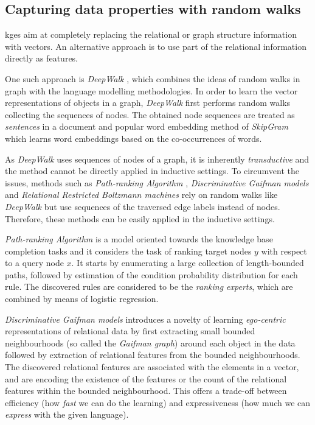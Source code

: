  
 
 





\subsection{Capturing data properties with random walks}


\gls{kge}s aim at completely replacing the relational or graph structure information with vectors.
An alternative approach is to use part of the relational information directly as features.


One such approach is \textit{DeepWalk} \cite{Perozzi:2014:DOL:2623330.2623732}, which combines the ideas of random walks in graph with the language modelling methodologies.
In order to learn the vector representations of objects in a graph, \textit{DeepWalk} first performs random walks collecting the sequences of nodes.
The obtained node sequences are treated as \textit{sentences} in a document and popular word embedding method of  \textit{SkipGram} \cite{NIPS2013_Skipgram} which learns word embeddings based on the co-occurrences of words.



As \textit{DeepWalk} uses sequences of nodes of a graph, it is inherently \textit{transductive} and the method cannot be directly applied in inductive settings.
To circumvent the issues, methods such as \textit{Path-ranking Algorithm} \cite{lao2010pra,Lao:2011:RWI:2145432.2145494}, \textit{Discriminative Gaifman models} \cite{Niepert:2016:DGM:3157382.3157479} and \textit{Relational Restricted Boltzmann machines} \cite{KaurILP17} rely on random walks like \textit{DeepWalk} but use sequences of the traversed edge labels instead of nodes.
Therefore, these methods can be easily applied in the inductive settings.



\textit{Path-ranking Algorithm} is a model oriented towards the knowledge base completion tasks and it considers the task of ranking target nodes $y$ with respect to a query node $x$.
It starts by enumerating a large collection of length-bounded paths, followed by estimation of the condition probability distribution for each rule.
The discovered rules are considered to be the \textit{ranking experts}, which are combined by means of logistic regression.




\textit{Discriminative Gaifman models} introduces a novelty of learning \textit{ego-centric} representations of relational data by first extracting small bounded neighbourhoods (so called the \textit{Gaifman graph}) around each object in the data followed by extraction of relational features from the bounded neighbourhoods.
The discovered relational features are associated with the elements in a vector, and are encoding the existence of the features or the count of the relational features within the bounded neighbourhood.
This offers a trade-off between efficiency (how \textit{fast} we can do the learning) and expressiveness (how much we can \textit{express} with the given language).



